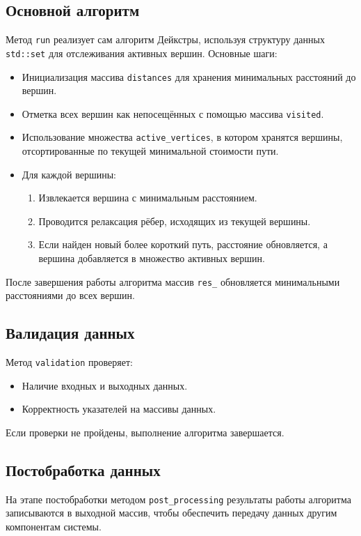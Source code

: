 \documentclass[a4paper,14pt]{extarticle}
\begin{document}
\subsection*{Основной алгоритм}

Метод \texttt{run} реализует сам алгоритм Дейкстры, используя структуру данных \texttt{std::set} для отслеживания активных вершин. Основные шаги:
\begin{itemize}
    \item Инициализация массива \texttt{distances} для хранения минимальных расстояний до вершин.
    \item Отметка всех вершин как непосещённых с помощью массива \texttt{visited}.
    \item Использование множества \texttt{active\_vertices}, в котором хранятся вершины, отсортированные по текущей минимальной стоимости пути.
\item Для каждой вершины:
    \begin{enumerate}
        \item Извлекается вершина с минимальным расстоянием.
        \item Проводится релаксация рёбер, исходящих из текущей вершины.
        \item Если найден новый более короткий путь, расстояние обновляется, а вершина добавляется в множество активных вершин.
    \end{enumerate}
\end{itemize}
После завершения работы алгоритма массив \texttt{res\_} обновляется минимальными расстояниями до всех вершин.

\subsection*{Валидация данных}

Метод \texttt{validation} проверяет:
\begin{itemize}
    \item Наличие входных и выходных данных.
    \item Корректность указателей на массивы данных.
\end{itemize}
Если проверки не пройдены, выполнение алгоритма завершается.

\subsection*{Постобработка данных}

На этапе постобработки методом \texttt{post\_processing} результаты работы алгоритма записываются в выходной массив, чтобы обеспечить передачу данных другим компонентам системы.
\end{document}
